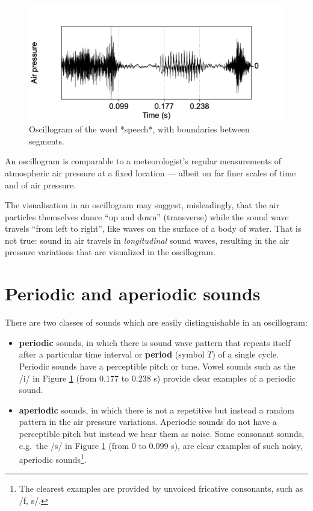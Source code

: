 \documentclass[
]{book}
\begin{document}
\begin{figure}

{\centering \includegraphics{figures/speech_word_oscillogram} 

}

\caption{Oscillogram of the word *speech*, with boundaries between segments.}\label{fig:speech-oscillogram}
\end{figure}

An oscillogram is comparable to a meteorologist's regular measurements of atmospheric air pressure at a fixed location --- albeit on far finer scales of time and of air pressure.

The visualisation in an oscillogram may suggest, misleadingly, that the air particles themselves dance ``up and down'' (transverse) while the sound wave travels ``from left to right'', like waves on the surface of a body of water. That is not true: sound in air travels in \emph{longitudinal} sound waves, resulting in the air pressure variations that are visualized in the oscillogram.

\section{Periodic and aperiodic sounds}\label{periodic-and-aperiodic-sounds}

There are two classes of sounds which are easily distinguishable in an oscillogram:

\begin{itemize}
\item
  \textbf{periodic} sounds, in which there is sound wave pattern that repeats itself after a particular time interval or \textbf{period} (symbol \(T\)) of a single cycle. Periodic sounds have a perceptible pitch or tone. Vowel sounds such as the /i/ in Figure \ref{fig:speech-oscillogram} (from 0.177 to 0.238 s) provide clear examples of a periodic sound.
\item
  \textbf{aperiodic} sounds, in which there is not a repetitive but instead a random pattern in the air pressure variations. Aperiodic sounds do not have a perceptible pitch but instead we hear them as noise. Some consonant sounds, e.g.~the /s/ in Figure \ref{fig:speech-oscillogram} (from 0 to 0.099 s), are clear examples of such noisy, aperiodic sounds\footnote{The clearest examples are provided by unvoiced fricative consonants, such as /f, s/.}.
\end{itemize}
\end{document}

